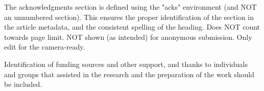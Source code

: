 \documentclass[sigconf,anonymous,review]{acmart}
\begin{document}




\newcommand{\artifact}[0]{\url{https://github.com/}}

\nocite{sphinx}










\appendix

\begin{acks}
The acknowledgments section is defined using the "acks" environment (and NOT an
unnumbered section). This ensures the proper identification of the section in
the article metadata, and the consistent spelling of the heading. Does NOT count
towards page limit. NOT shown (as intended) for anonymous submission. Only edit
for the camera-ready.

Identification of funding sources and other support, and thanks to individuals
and groups that assisted in the research and the preparation of the work should
be included.
\end{acks}
\end{document}
